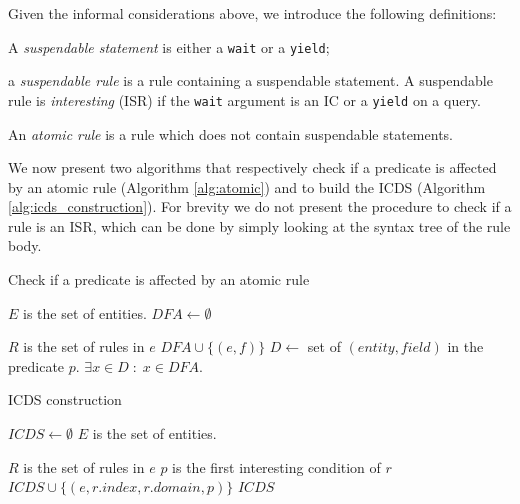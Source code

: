 Given the informal considerations above, we introduce the following definitions:
\begin{inparaenum}[i)]
\item A \textit{suspendable statement} is either a \texttt{wait} or a \texttt{yield};
\item a \textit{suspendable rule} is a rule containing a suspendable statement. A suspendable rule is \textit{interesting} (ISR) if the \texttt{wait} argument is an IC or a \texttt{yield} on a query.
\item An \textit{atomic rule} is a rule which does not contain suspendable statements.
\end{inparaenum}

We now present two algorithms that respectively check if a predicate is affected by an atomic rule (Algorithm \ref{alg:atomic}) and to build the ICDS (Algorithm \ref{alg:icds_construction}). For brevity we do not present the procedure to check if a rule is an ISR, which can be done by simply looking at the syntax tree of the rule body.

\vspace{-5pt}
\begin{algorithm}
\caption{Check if a predicate is affected by an atomic rule}
\tiny
\label{alg:atomic}
\begin{algorithmic}
    \State $E$ is the set of entities.
    \State $DFA \gets \emptyset$

        \State $R$ is the set of rules in $e$
                    \State $DFA \cup \lbrace (e,f) \rbrace$
                \EndFor
            \EndIf
        \EndFor
    \EndFor
    \State $D \gets$ set of $(entity,field)$ in the predicate $p$.
    \State \Return $\exists x \in D \; : \; x \in DFA$.
\EndFunction
\end{algorithmic}
\end{algorithm}
\vspace{-22pt}
\begin{algorithm}
\caption{ICDS construction}
\tiny
\label{alg:icds_construction}
\begin{algorithmic}
    \State $ICDS \gets \emptyset$
    \State $E$ is the set of entities.

        \State $R$ is the set of rules in $e$
                \State $p$ is the first interesting condition of $r$
                    \State $ICDS \cup \lbrace (e,r.index,r.domain,p) \rbrace$
                \EndIf
            \EndIf
        \EndFor
    \EndFor
    \State \Return $ICDS$
\EndFunction
\end{algorithmic}
\end{algorithm}
\vspace{-5pt}

